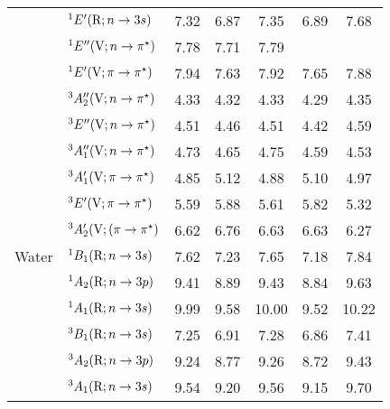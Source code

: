 \begin{tabular}{p{3.5cm}p{3.3cm}c|cccc}
        &$^1E^\prime (\mathrm{R}; n \rightarrow 3s)$					& 7.32	&6.87	&7.35	&6.89	&7.68 \\	
        &$^1E^{\prime\prime} (\mathrm{V}; n \rightarrow \pi^\star)$					& 7.78	&7.71	&7.79	&	 	&\\
        &$^1E^\prime (\mathrm{V}; \pi \rightarrow \pi^\star)$					& 7.94	&7.63	&7.92	&7.65	&7.88 \\	
        &$^3A_2^{\prime\prime} (\mathrm{V}; n \rightarrow \pi^\star)$				& 4.33	&4.32	&4.33	&4.29	&4.35 \\	
        &$^3E^{\prime\prime} (\mathrm{V}; n \rightarrow \pi^\star)$					& 4.51	&4.46	&4.51	&4.42	&4.59 	\\
        &$^3A_1^{\prime\prime} (\mathrm{V}; n \rightarrow \pi^\star)$				& 4.73	&4.65	&4.75	&4.59	&4.53 	\\
        &$^3A_1^\prime (\mathrm{V}; \pi \rightarrow \pi^\star)$				& 4.85	&5.12	&4.88	&5.10	&4.97 	\\
        &$^3E^\prime (\mathrm{V}; \pi \rightarrow \pi^\star)$					& 5.59	&5.88	&5.61	&5.82	&5.32 	\\
        &$^3A_2^\prime (\mathrm{V}; (\pi \rightarrow \pi^\star)$				& 6.62	&6.76	&6.63	&6.63	&6.27 	\\
  Water		& $^1B_1 (\mathrm{R}; n \rightarrow 3s)$ 				&7.62	&7.23	&7.65	&7.18	&7.84	\\
        & $^1A_2 (\mathrm{R}; n \rightarrow 3p)$ 				&9.41	&8.89	&9.43	&8.84	&9.63	\\
        & $^1A_1 (\mathrm{R}; n \rightarrow 3s)$ 				&9.99	&9.58	&10.00	&9.52	&10.22	\\
        & $^3B_1 (\mathrm{R}; n \rightarrow 3s)$ 				&7.25	&6.91	&7.28	&6.86	&7.41	\\
        & $^3A_2 (\mathrm{R}; n \rightarrow 3p)$ 				&9.24 	&8.77	&9.26	&8.72	&9.43	\\
        & $^3A_1 (\mathrm{R}; n \rightarrow 3s)$ 				&9.54	&9.20	&9.56	&9.15	&9.70	\\
   \end{tabular}